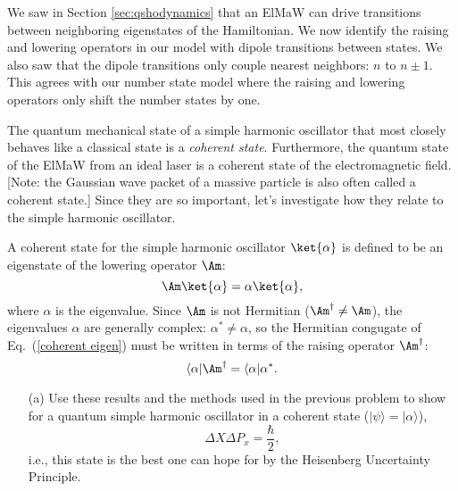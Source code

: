 We saw in Section \ref{sec:qshodynamics} that an ElMaW can drive transitions between neighboring eigenstates of the Hamiltonian. We now identify the raising and lowering operators in our model with dipole transitions between states. We also saw that the dipole transitions only couple nearest neighbors: $n$ to $n\pm1$. This agrees with our number state model where the raising and lowering operators only shift the number states by one.


\begin{exercise}
\label{ex:coherentstate}
The quantum mechanical state of a simple harmonic oscillator that most closely behaves like a classical state is a {\em coherent state}.   Furthermore, the quantum state of the ElMaW from an ideal laser is a coherent state of the electromagnetic field.  [Note: the Gaussian wave packet of a massive particle is also often called a coherent state.] Since they are so important, let's investigate how they relate to the simple harmonic oscillator.  

A coherent state for the simple harmonic oscillator $\ket{\alpha}$ is defined to be an eigenstate of the lowering operator $\Am$:
%
\begin{equation}
\Am\ket{\alpha} = \alpha\ket{\alpha},
\label{coherent eigen}
\end{equation}
%
where $\alpha$ is the eigenvalue.  Since $\Am$ is not Hermitian ($\Am^\dagger \neq \Am$), the eigenvalues $\alpha$ are generally complex: $\alpha^{*} \neq \alpha$, so the Hermitian congugate of Eq.~(\ref{coherent eigen}) must be written in terms of the raising operator $\Am^{\dag}$: 
%
\begin{equation}
\langle\alpha|\Am^{\dagger}=  \langle\alpha|\alpha^{*}.
\label{adjoint coherent eigen}
\end{equation}
%

\begin{enumerate}

\item[(a)]  Use these results and the methods used in the previous problem to show for a quantum simple harmonic oscillator in a coherent state ($|\psi\rangle = |\alpha\rangle$), 
%
\begin{equation}
\Delta X\Delta P_{x} = \frac{\hbar}{2},
\end{equation}
%
i.e., this state is the best one can hope for by the Heisenberg Uncertainty Principle.


\end{enumerate}
\end{exercise}
